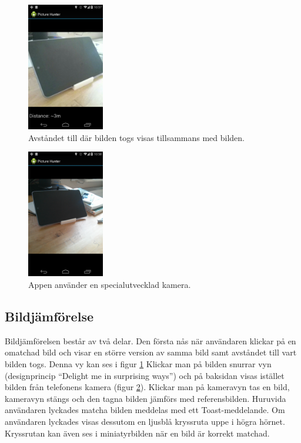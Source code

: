 \documentclass[11px, a4paper, twocolumn]{article}
\begin{document}
	\begin{figure}[p]
		\centering
	    \includegraphics[width=0.3\textwidth]{img/detail}
		\caption{\label{fig:detail}Avståndet till där bilden togs visas tillsammans med bilden.}
	\end{figure}

	\begin{figure}[p]
		\centering
	    \includegraphics[width=0.3\textwidth]{img/camera}
		\caption{\label{fig:camera}Appen använder en specialutvecklad kamera.}
	\end{figure}

\subsection{Bildjämförelse}
	Bildjämförelsen består av två delar. Den första nås när användaren klickar på en omatchad bild och visar en större version av samma bild samt avståndet till vart bilden togs. Denna vy kan ses i figur \ref{fig:detail} Klickar man på bilden snurrar vyn (designprincip ``Delight me in surprising ways''\cite{Principles}) och på baksidan visas istället bilden från telefonens kamera (figur \ref{fig:camera}). Klickar man på kameravyn tas en bild, kameravyn stängs och den tagna bilden jämförs med referensbilden. Huruvida användaren lyckades matcha bilden meddelas med ett Toast-meddelande. Om användaren lyckades visas dessutom en ljusblå kryssruta uppe i högra hörnet. Kryssrutan kan även ses i miniatyrbilden när en bild är korrekt matchad.
\end{document}
